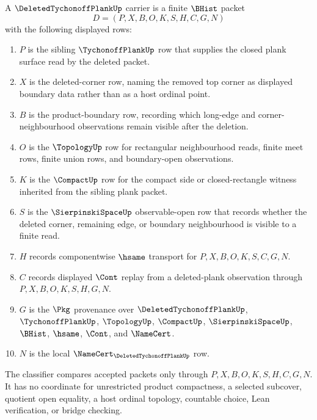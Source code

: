 \begin{definition}
\label{def:deleted-tychonoff-plank-carrier}
A $\DeletedTychonoffPlankUp$ carrier is a finite $\BHist$ packet
$$
D=(P,X,B,O,K,S,H,C,G,N)
$$
with the following displayed rows:
\begin{enumerate}
\item $P$ is the sibling $\TychonoffPlankUp$ row that supplies the closed plank surface read by the deleted packet.
\item $X$ is the deleted-corner row, naming the removed top corner as displayed boundary data rather than as a host ordinal point.
\item $B$ is the product-boundary row, recording which long-edge and corner-neighbourhood observations remain visible after the deletion.
\item $O$ is the $\TopologyUp$ row for rectangular neighbourhood reads, finite meet rows, finite union rows, and boundary-open observations.
\item $K$ is the $\CompactUp$ row for the compact side or closed-rectangle witness inherited from the sibling plank packet.
\item $S$ is the $\SierpinskiSpaceUp$ observable-open row that records whether the deleted corner, remaining edge, or boundary neighbourhood is visible to a finite read.
\item $H$ records componentwise $\hsame$ transport for $P,X,B,O,K,S,C,G,N$.
\item $C$ records displayed $\Cont$ replay from a deleted-plank observation through $P,X,B,O,K,S,H,G,N$.
\item $G$ is the $\Pkg$ provenance over $\DeletedTychonoffPlankUp$, $\TychonoffPlankUp$, $\TopologyUp$, $\CompactUp$, $\SierpinskiSpaceUp$, $\BHist$, $\hsame$, $\Cont$, and $\NameCert$.
\item $N$ is the local $\NameCert_{\DeletedTychonoffPlankUp}$ row.
\end{enumerate}
The classifier compares accepted packets only through $P,X,B,O,K,S,H,C,G,N$. It has no coordinate for unrestricted product compactness, a selected subcover, quotient open equality, a host ordinal topology, countable choice, Lean verification, or bridge checking.
\end{definition}

